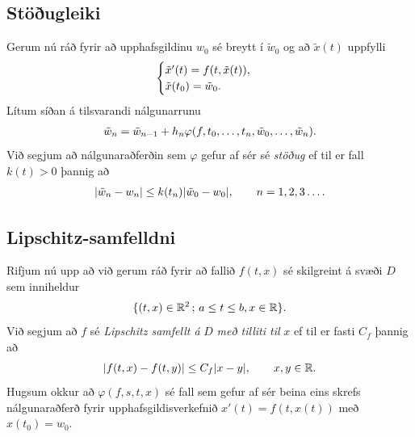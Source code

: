 \documentclass[letterpaper,10pt,icelandic]{sphinxmanual}
\begin{document}
\subsection{Stöðugleiki}
\label{kafli06:index-20}\label{kafli06:stougleiki}
Gerum nú ráð fyrir að upphafsgildinu \(w_0\) sé breytt í
\(\tilde w_0\) og að \(\tilde x(t)\) uppfylli
\begin{gather}
\begin{split}\begin{cases}
  \tilde x'(t)=f(t,\tilde x(t)),\\
\tilde x(t_0)=\tilde w_0.
\end{cases}\end{split}\notag
\end{gather}
Lítum síðan á tilsvarandi nálgunarrunu
\begin{gather}
\begin{split}\tilde w_n=\tilde w_{n-1}+h_n\varphi(f,t_0,\dots,t_n,\tilde
w_0,\dots,\tilde w_n).\end{split}\notag
\end{gather}
Við segjum að nálgunaraðferðin sem \(\varphi\)
gefur af sér sé \emph{stöðug} ef til er fall \(k(t)>0\) þannig að
\begin{gather}
\begin{split}|\tilde w_n-w_n|\leq k(t_n)|\tilde w_0-w_0|, \qquad n=1,2,3\dots.\end{split}\notag
\end{gather}

\subsection{Lipschitz-samfelldni}
\label{kafli06:lipschitz-samfelldni}\label{kafli06:index-21}
Rifjum nú upp að við gerum ráð fyrir að fallið \(f(t,x)\) sé
skilgreint á svæði \(D\) sem inniheldur
\begin{gather}
\begin{split}\{(t,x)\in {{\mathbb  R}}^2 \, ;\, a\leq t\leq b, x\in {{\mathbb  R}}\}.\end{split}\notag
\end{gather}
Við segjum að \(f\) sé \emph{Lipschitz samfellt á} \(D\) \emph{með tilliti
til} \(x\) ef til er fasti \(C_f\) þannig að
\begin{gather}
\begin{split}|f(t,x)-f(t,y)|\leq C_f|x-y|, \qquad x,y\in {{\mathbb  R}}.\end{split}\notag
\end{gather}
Hugsum okkur að \(\varphi(f,s,t,x)\) sé fall sem gefur af sér beina
eins skrefs nálgunaraðferð fyrir upphafsgildisverkefnið
\(x'(t)=f(t,x(t))\) með \(x(t_0)=w_0\).
\end{document}
